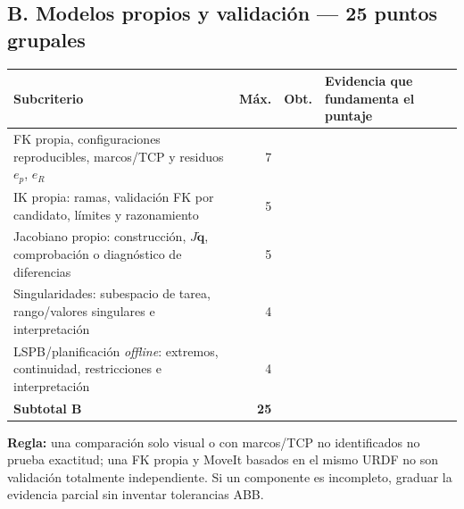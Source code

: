 \documentclass[10pt, a4paper]{article}
\begin{document}
\subsection*{B. Modelos propios y validación — 25 puntos grupales}
\begingroup
\scriptsize
\setlength{\tabcolsep}{3.5pt}
\renewcommand{\arraystretch}{1.40}
\noindent\begin{tabularx}{\textwidth}{|>{\hsize=1.15\hsize\raggedright\arraybackslash}X|r|r|>{\hsize=0.85\hsize\raggedright\arraybackslash}X|}
\hline
\rowcolor{ucbblue!15}
\textbf{Subcriterio} & \textbf{Máx.} & \textbf{Obt.} & \textbf{Evidencia que fundamenta el puntaje} \\ \hline
FK propia, configuraciones reproducibles, marcos/TCP y residuos $e_p$, $e_R$ & 7 & & \\ \hline
IK propia: ramas, validación FK por candidato, límites y razonamiento & 5 & & \\ \hline
Jacobiano propio: construcción, $J\dot{\mathbf{q}}$, comprobación o diagnóstico de diferencias & 5 & & \\ \hline
Singularidades: subespacio de tarea, rango/valores singulares e interpretación & 4 & & \\ \hline
LSPB/planificación \textit{offline}: extremos, continuidad, restricciones e interpretación & 4 & & \\ \hline
\rowcolor{offcolor}
\textbf{Subtotal B} & \textbf{25} & & \\ \hline
\end{tabularx}
\endgroup

{\footnotesize\textbf{Regla:} una comparación solo visual o con marcos/TCP no identificados no prueba exactitud; una FK propia y MoveIt basados en el mismo URDF no son validación totalmente independiente. Si un componente es incompleto, graduar la evidencia parcial sin inventar tolerancias ABB.}
\end{document}
